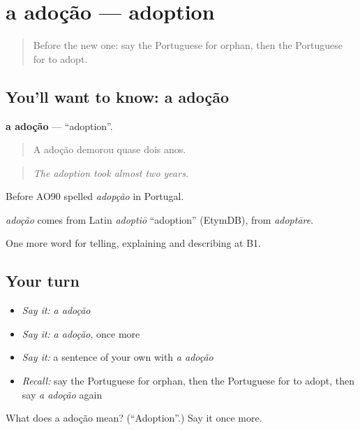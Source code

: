 \section[a adoção]{a adoção — adoption}

\label{lesson:PT-C493-adocao}



\begin{quote}
Before the new one: say the Portuguese for orphan, then the Portuguese for to adopt.
\end{quote}

\subsection*{You'll want to know: a adoção}
\textbf{a adoção} — \textquotedblleft{}adoption\textquotedblright{}.

\begin{quote}
A adoção demorou quase dois anos.
\end{quote}

\begin{quote}
\emph{The adoption took almost two years.}
\end{quote}

Before AO90 spelled \emph{adopção} in Portugal.

\begin{cousinweb}
\emph{adoção} comes from Latin \emph{adoptiō} \textquotedblleft{}adoption\textquotedblright{} (EtymDB), from \emph{adoptāre}.
\end{cousinweb}

\begin{grammarlens}[title={What you've built}]
One more word for telling, explaining and describing at B1.
\end{grammarlens}

\subsection*{Your turn}
\begin{itemize}
\raggedright
  \item \emph{Say it:} \emph{a adoção}
  \item \emph{Say it:} \emph{a adoção}, once more
  \item \emph{Say it:} a sentence of your own with \emph{a adoção}
  \item \emph{Recall:} say the Portuguese for orphan, then the Portuguese for to adopt, then say \emph{a adoção} again
\end{itemize}

\begin{tcolorbox}[breakable,colback=teal!4,colframe=teal!35!black,title={Before you move on}]
What does a adoção mean? (\textquotedblleft{}Adoption\textquotedblright{}.) Say it once more.
\end{tcolorbox}
